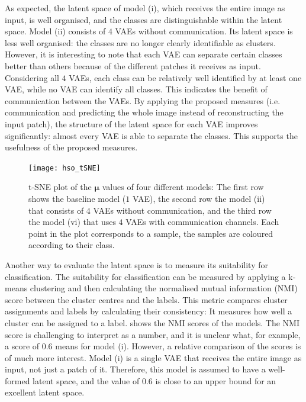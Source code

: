 As expected, the latent space of model (i), which receives the entire image as input, is well organised, and the classes are distinguishable within the latent space. Model (ii) consists of $4$ VAEs without communication. Its latent space is less well organised: the classes are no longer clearly identifiable as clusters. However, it is interesting to note that each VAE can separate certain classes better than others because of the different patches it receives as input. Considering all $4$ VAEs, each class can be relatively well identified by at least one VAE, while no VAE can identify all classes. This indicates the benefit of communication between the VAEs.
By applying the proposed measures (i.e. communication and predicting the whole image instead of reconstructing the input patch), the structure of the latent space for each VAE improves significantly: almost every VAE is able to separate the classes. This supports the usefulness of the proposed measures.

\begin{figure}[h]
    \centering
    \texttt{[image: hso\_tSNE]}
    \caption[t-SNE plot of the $\boldsymbol{\mu}$ values of different models]{t-SNE plot of the $\boldsymbol{\mu}$ values of four different models: The first row shows the baseline model ($1$ VAE), the second row the model (ii) that consists of $4$ VAEs without communication, and the third row the model (vi) that uses $4$ VAEs with communication channels. Each point in the plot corresponds to a sample, the samples are coloured according to their class.}
\end{figure}


Another way to evaluate the latent space is to measure its suitability for classification. The suitability for classification can be measured by applying a k-means clustering and then calculating the normalised mutual information (NMI) score between the cluster centres and the labels. This metric compares cluster assignments and labels by calculating their consistency: It measures how well a cluster can be assigned to a label.  shows the NMI scores of the models.
The NMI score is challenging to interpret as a number, and it is unclear what, for example, a score of $0.6$ means for model (i). However, a relative comparison of the scores is of much more interest. Model (i) is a single VAE that receives the entire image as input, not just a patch of it. Therefore, this model is assumed to have a well-formed latent space, and the value of $0.6$ is close to an upper bound for an excellent latent space.


